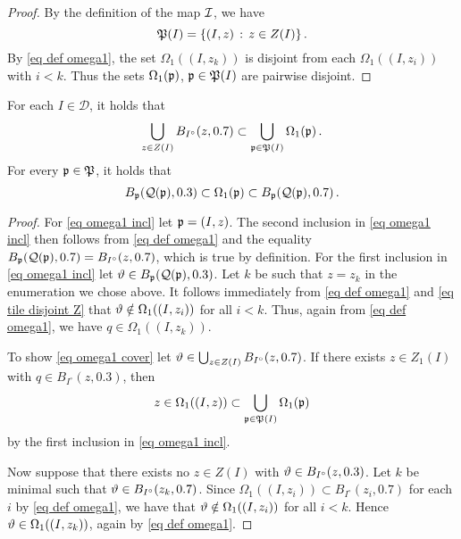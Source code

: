 {\begin{proof}
    By the definition of the map $\sc$, we have
    $$
        \fP(I) = \{(I, z) \, : \, z \in Z(I)\}\,.
    $$
    By \eqref{eq def omega1}, the set $\Omega_1((I, z_k))$ is disjoint from each $\Omega_1((I, z_i))$ with $i < k$. Thus the sets $\Omega_1(\fp)$, $\fp \in \fP(I)$ are pairwise disjoint.
\end{proof}

\begin{lemma}
\label{frequency cube cover}
    For each $I \in \mathcal{D}$, it holds that
    \begin{equation}
    \label{eq omega1 cover}
         \bigcup_{z \in Z(I)} B_{I^\circ}(z, 0.7)\subset \bigcup_{\fp \in \fP(I)} \Omega_1(\fp)\,.
    \end{equation}
    For every $\fp \in \fP$, it holds that
    \begin{equation}
        \label{eq omega1 incl}
        B_{\fp}(\fcc(\fp), 0.3) \subset \Omega_1(\fp) \subset B_{\fp}(\fcc(\fp), 0.7)\,.
    \end{equation}
\end{lemma}

\begin{proof}
    For \eqref{eq omega1 incl} let $\fp = (I, z)$.
    The second inclusion in \eqref{eq omega1 incl} then follows from \eqref{eq def omega1} and the equality $B_{\fp}(\fcc(\fp), 0.7) = B_{I^\circ}(z, 0.7)$, which is true by definition.
    For the first inclusion in \eqref{eq omega1 incl} let $\mfa \in B_{\fp}(\fcc(\fp),0.3)$. Let $k$ be such that $z = z_k$ in the enumeration we chose above. It follows immediately from \eqref{eq def omega1} and \eqref{eq tile disjoint Z} that
    $\mfa \notin \Omega_1((I, z_i))$ for all $i < k$. Thus, again from \eqref{eq def omega1}, we have
    $q \in \Omega_1((I,z_k))$.

    To show \eqref{eq omega1 cover} let $\mfa \in \bigcup_{z \in Z(I)} B_{I^\circ}(z,0.7)$.
    If there exists $z \in Z_1(I)$ with $q \in B_{I^\circ}(z,0.3)$, then
    $$
        z \in \Omega_1((I, z)) \subset \bigcup_{\fp \in \fP(I)} \Omega_1(\fp)
    $$
    by the first inclusion in \eqref{eq omega1 incl}.

    Now suppose that there exists no $z \in Z(I)$ with $\mfa \in B_{I^\circ}(z, 0.3)$. Let $k$ be minimal such that $\mfa \in B_{I^\circ}(z_k, 0.7)$. Since $\Omega_1((I, z_i)) \subset B_{I^\circ}(z_i, 0.7)$ for each $i$ by \eqref{eq def omega1}, we have that $\mfa \notin \Omega_1((I, z_i))$ for all $i < k$. Hence $\mfa \in \Omega_1((I, z_k))$, again by \eqref{eq def omega1}.
\end{proof}

}
